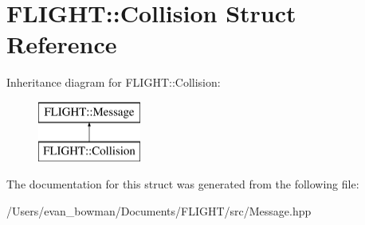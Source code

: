 \hypertarget{struct_f_l_i_g_h_t_1_1_collision}{}\section{F\+L\+I\+G\+HT\+:\+:Collision Struct Reference}
\label{struct_f_l_i_g_h_t_1_1_collision}
Inheritance diagram for F\+L\+I\+G\+HT\+:\+:Collision\+:\begin{figure}[H]
\begin{center}
\leavevmode
\includegraphics[height=2.000000cm]{struct_f_l_i_g_h_t_1_1_collision}
\end{center}
\end{figure}


The documentation for this struct was generated from the following file\+:\begin{DoxyCompactItemize}
\item 
/\+Users/evan\+\_\+bowman/\+Documents/\+F\+L\+I\+G\+H\+T/src/Message.\+hpp\end{DoxyCompactItemize}

